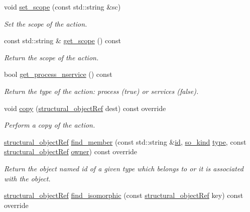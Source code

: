 \begin{DoxyCompactItemize}
void \hyperlink{classaction__o_a9f4c91fe76ac45b6b7947b7e951a98db}{set\+\_\+scope} (const std\+::string \&sc)
\begin{DoxyCompactList}\small\item\em Set the scope of the action. \end{DoxyCompactList}\item 
const std\+::string \& \hyperlink{classaction__o_aba261f3be11571b2161360f3ab56e21e}{get\+\_\+scope} () const
\begin{DoxyCompactList}\small\item\em Return the scope of the action. \end{DoxyCompactList}\item 
bool \hyperlink{classaction__o_a8034744ad466f3a61fc2af50ef076925}{get\+\_\+process\+\_\+nservice} () const
\begin{DoxyCompactList}\small\item\em Return the type of the action\+: process (true) or services (false). \end{DoxyCompactList}\item 
void \hyperlink{classaction__o_ad43a70b3b57e4ce60508ad0ee04396ff}{copy} (\hyperlink{structural__objects_8hpp_a8ea5f8cc50ab8f4c31e2751074ff60b2}{structural\+\_\+object\+Ref} dest) const override
\begin{DoxyCompactList}\small\item\em Perform a copy of the action. \end{DoxyCompactList}\item 
\hyperlink{structural__objects_8hpp_a8ea5f8cc50ab8f4c31e2751074ff60b2}{structural\+\_\+object\+Ref} \hyperlink{classaction__o_a5de21fd62558bb70eb8e9b34bc1ef6ec}{find\+\_\+member} (const std\+::string \&\hyperlink{classstructural__object_a841a75f6e349ff7c1987dc92d4ac33a6}{id}, \hyperlink{structural__objects_8hpp_acf52399aecacb7952e414c5746ce6439}{so\+\_\+kind} \hyperlink{classstructural__object_a9a7159ce4c8da9984f256d9032f49778}{type}, const \hyperlink{structural__objects_8hpp_a8ea5f8cc50ab8f4c31e2751074ff60b2}{structural\+\_\+object\+Ref} \hyperlink{classstructural__object_a3e96b3e00b8a78adfc44872d82e186ea}{owner}) const override
\begin{DoxyCompactList}\small\item\em Return the object named id of a given type which belongs to or it is associated with the object. \end{DoxyCompactList}\item 
\hyperlink{structural__objects_8hpp_a8ea5f8cc50ab8f4c31e2751074ff60b2}{structural\+\_\+object\+Ref} \hyperlink{classaction__o_aeda1f184bbdd2210b45361a5da845b85}{find\+\_\+isomorphic} (const \hyperlink{structural__objects_8hpp_a8ea5f8cc50ab8f4c31e2751074ff60b2}{structural\+\_\+object\+Ref} key) const override

\end{DoxyCompactItemize}
